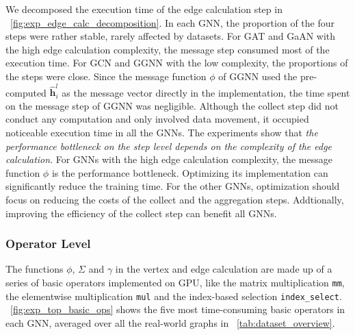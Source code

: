 We decomposed the execution time of the edge calculation step in \figurename~\ref{fig:exp_edge_calc_decomposition}.
In each GNN, the proportion of the four steps were rather stable, rarely affected by datasets.
For GAT and GaAN with the high edge calculation complexity, the message step consumed most of the execution time.
For GCN and GGNN with the low complexity, the proportions of the steps were close.
Since the message function $\phi$ of GGNN used the pre-computed $\hat{\boldsymbol{h}}^l_i$ as the message vector directly in the implementation, the time spent on the message step of GGNN was negligible.
Although the collect step did not conduct any computation and only involved data movement, it occupied noticeable execution time in all the GNNs.
The experiments show that \emph{the performance bottleneck on the step level depends on the complexity of the edge calculation}.
For GNNs with the high edge calculation complexity, the message function $\phi$ is the performance bottleneck.
Optimizing its implementation can significantly reduce the training time.
For the other GNNs, optimization should focus on reducing the costs of the collect and the aggregation steps.
Addtionally, improving the efficiency of the collect step can benefit all GNNs.

\subsubsection{Operator Level}

The functions $\phi$, $\Sigma$ and $\gamma$ in the vertex and edge calculation are made up of a series of basic operators implemented on GPU, like the matrix multiplication \texttt{mm}, the elementwise multiplication \texttt{mul} and the index-based selection \texttt{index\_select}.
\figurename~\ref{fig:exp_top_basic_ops} shows the five most time-consuming basic operators in each GNN, averaged over all the real-world graphs in \tablename~\ref{tab:dataset_overview}.

